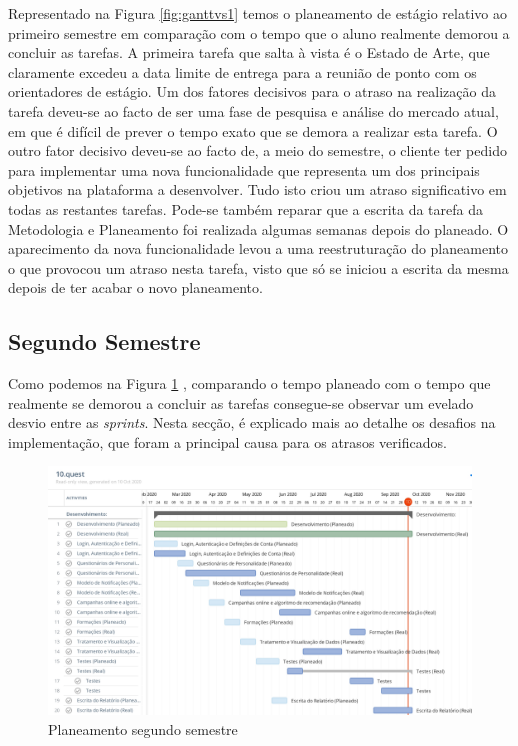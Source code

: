 Representado na Figura \ref{fig:ganttvs1} temos o planeamento de estágio relativo ao primeiro semestre em comparação com o tempo que o aluno realmente demorou a concluir as tarefas. A primeira tarefa que salta à vista é o Estado de Arte, que claramente excedeu a data limite de entrega para a reunião de ponto com os orientadores de estágio. Um dos fatores decisivos para o atraso na realização da tarefa deveu-se ao facto de ser uma fase de pesquisa e análise do mercado atual, em que é difícil de prever o tempo exato que se demora a realizar esta tarefa. O outro fator decisivo deveu-se ao facto de, a meio do semestre, o cliente ter pedido para implementar uma nova funcionalidade que representa um dos principais objetivos na plataforma a desenvolver. Tudo isto criou um atraso significativo em todas as restantes tarefas. Pode-se também reparar que a escrita da tarefa da Metodologia e Planeamento foi realizada algumas semanas depois do planeado. O aparecimento da nova funcionalidade levou a uma reestruturação do planeamento o que provocou um atraso nesta tarefa, visto que só se iniciou a escrita da mesma depois de ter acabar o novo planeamento.

\subsection{Segundo Semestre}

Como podemos na Figura \ref{fig:plane_2_semestre} , comparando o tempo planeado com o tempo que realmente se demorou a concluir as tarefas consegue-se observar um evelado desvio entre as \textit{sprints}. Nesta secção, é explicado mais ao detalhe os desafios na implementação, que foram a principal causa para os atrasos verificados.

\begin{figure}[ht!]
	\begin{center}
		\includegraphics[width=1\textwidth]{img/dev}
		\caption{Planeamento segundo semestre}
		\label{fig:plane_2_semestre}
	\end{center}
\end{figure}

